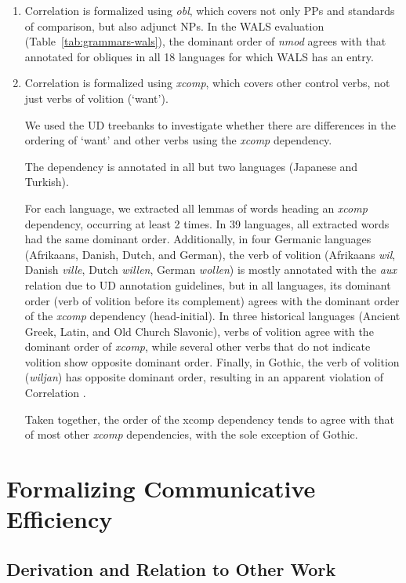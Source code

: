 \documentclass[10pt,twoside,lineno]{article}
\begin{document}
\begin{enumerate}
\item Correlation {} is formalized using \emph{obl}, which covers not only PPs and standards of comparison, but also adjunct NPs.
In the WALS evaluation (Table~\ref{tab:grammars-wals}), the dominant order of \emph{nmod} agrees with that annotated for obliques in all 18 languages for which WALS has an entry.
	
\item Correlation {} is formalized using \emph{xcomp}, which covers other control verbs, not just verbs of volition (`want').

We used the UD treebanks to investigate whether there are differences in the ordering of `want' and other verbs using the \emph{xcomp} dependency.

The dependency is annotated in all but two languages (Japanese and Turkish).

For each language, we extracted all lemmas of words heading an \emph{xcomp} dependency, occurring at least 2 times.
In 39 languages, all extracted words had the same dominant order.
Additionally, in four Germanic languages (Afrikaans, Danish, Dutch, and German), the verb of volition (Afrikaans \emph{wil}, Danish \emph{ville}, Dutch \emph{willen}, German \emph{wollen}) is mostly annotated with the \emph{aux} relation due to UD annotation guidelines, but in all languages, its dominant order (verb of volition before its complement) agrees with the dominant order of the \emph{xcomp} dependency (head-initial).
In three historical languages (Ancient Greek, Latin, and Old Church Slavonic), verbs of volition agree with the dominant order of \emph{xcomp}, while several other verbs that do not indicate volition show opposite dominant order.
Finally, in Gothic, the verb of volition (\emph{wiljan}) has opposite dominant order, resulting in an apparent violation of Correlation .

Taken together, the order of the xcomp dependency tends to agree with that of most other \emph{xcomp} dependencies, with the sole exception of Gothic.
\end{enumerate}

\section{Formalizing Communicative Efficiency}
\subsection{Derivation and Relation to Other Work}
\end{document}
